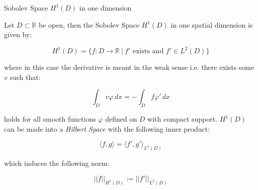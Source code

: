 \begin{definition}\label{def:oned-H1-D}
    Sobolev Space $H^1(D)$ in one dimension

    Let $D \subset \mathbb{R}$ be open, then the Sobolev Space $H^1(D)$ in one
    spatial dimension is given by:

    \begin{equation}\label{eq:oned-H1-D}
        H^1(D) = \{f: D \rightarrow \mathbb{R}\ |\ f' \text{ exists and }
                    f' \in L^2(D)\}
    \end{equation}

    where in this case the derivative is meant in the weak sense i.e. there
    exists some $v$ such that:

    \[
        \int_D v\varphi\, dx = -\int_Df\varphi'\, dx
    \]

    holds for all smooth functions $\varphi$ defined on $D$ with compact
    support. $H^1(D)$ can be made into a \textit{Hilbert Space} with the
    following inner product:

    \begin{equation}\label{eq:oned-H1-D-inner-prod}
        \langle f, g\rangle = \langle f', g' \rangle_{L^2(D)}
    \end{equation}

    which induces the following norm:

    \begin{equation}\label{eq:oned-H1-D-norm}
        ||f||_{H^1(D)} := ||f'||_{L^2(D)}
    \end{equation}
\end{definition}

